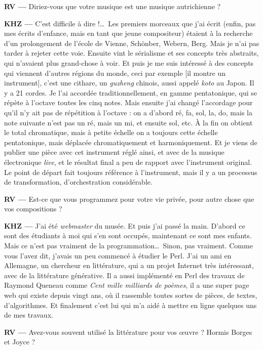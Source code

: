\documentclass[a4paper,12pt]{article}
\begin{document}
\textbf{RV ---} Diriez-vous que votre musique est une musique autrichienne ?

\textbf{KHZ ---} C'est difficile à dire !\dots~Les premiers morceaux que j'ai écrit (enfin, pas mes écrits d'enfance, mais en tant que jeune compositeur) étaient à la recherche d'un prolongement de l'école de Vienne, Schönber, Webern, Berg. Mais je n'ai pas tarder à rejeter cette voie. Ensuite vint le sérialisme et ses concepts très abstraits, qui n'avaient plus grand-chose à voir. Et puis je me suis intéressé à des concepts qui viennent d'autres régions du monde, ceci par exemple [il montre un instrument], c'est une cithare, un \emph{guzheng} chinois, aussi appelé \emph{koto} au Japon. Il y a 21 cordes. Je l'ai accordée traditionnellement, en gamme pentatonique, qui se répète à l'octave toutes les cinq notes. Mais ensuite j'ai changé l'accordage pour qu'il n'y ait pas de répétition à l'octave : on a d'abord ré, fa, sol, la, do, mais la note suivante n'est pas un ré, mais un mi, et ensuite sol, etc. À la fin on obtient le total chromatique, mais à petite échelle on a toujours cette échelle pentatonique, mais déplacée chromatiquement et harmoniquement. Et je viens de publier une pièce avec cet instrument réglé ainsi, et avec de la musique électronique \emph{live}, et le résultat final a peu de rapport avec l'instrument original. Le point de départ fait toujours référence à l'instrument, mais il y a un processus de transformation, d'orchestration considérable.

\textbf{RV ---} Est-ce que vous programmez pour votre vie privée, pour autre chose que vos compositions ?

\textbf{KHZ ---} J'ai été \emph{webmaster} du musée. Et puis j'ai passé la main. D'abord ce sont des étudiants à moi qui s'en sont occupés, maintenant ce sont mes enfants. Mais ce n'est pas vraiment de la programmation\dots~Sinon, pas vraiment. Comme vous l'avez dit, j'avais un peu commencé à étudier le Perl. J'ai un ami en Allemagne, un chercheur en littérature, qui a un projet Internet très intéressant, avec de la littérature générative. Il a aussi implémenté en Perl des travaux de Raymond Queneau comme \emph{Cent mille milliards de poèmes}, il a une super page web qui existe depuis vingt ans, où il rassemble toutes sortes de pièces, de textes, d'algorithmes. Et finalement c'est lui qui m'a aidé à mettre en ligne quelques uns de mes travaux.

\textbf{RV ---} Avez-vous souvent utilisé la littérature pour vos œuvre ? Hormis Borges et Joyce ?
\end{document}
